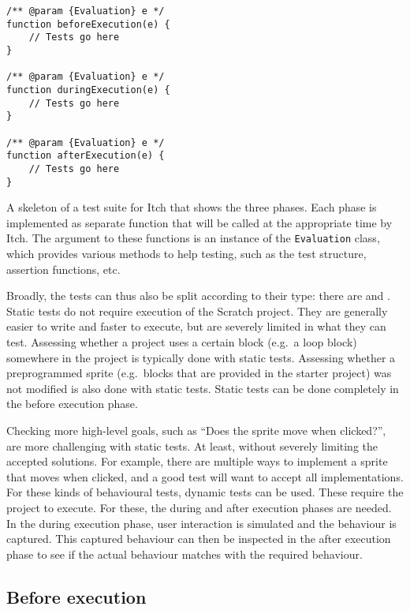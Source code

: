 \documentclass[../main]{subfiles}
\begin{document}
\begin{listing}
    \begin{verbatim}
/** @param {Evaluation} e */
function beforeExecution(e) {
    // Tests go here
}

/** @param {Evaluation} e */
function duringExecution(e) {
    // Tests go here
}

/** @param {Evaluation} e */
function afterExecution(e) {
    // Tests go here
}
    \end{verbatim}
    \caption[]{
        A skeleton of a test suite for Itch that shows the three phases.
        Each phase is implemented as separate function that will be called at the appropriate time by Itch.
        The argument to these functions is an instance of the \texttt{Evaluation} class, which provides various methods to help testing, such as the test structure, assertion functions, etc.
    }
    \label{lst:itch-test-suite-skeleton}
\end{listing}

Broadly, the tests can thus also be split according to their type: there are  and .
Static tests do not require execution of the Scratch project.
They are generally easier to write and faster to execute, but are severely limited in what they can test.
Assessing whether a project uses a certain block (e.g.\ a loop block) somewhere in the project is typically done with static tests.
Assessing whether a preprogrammed sprite (e.g.\ blocks that are provided in the starter project) was not modified is also done with static tests.
Static tests can be done completely in the before execution phase.

Checking more high-level goals, such as ``Does the sprite move when clicked?'', are more challenging with static tests.
At least, without severely limiting the accepted solutions.
For example, there are multiple ways to implement a sprite that moves when clicked, and a good test will want to accept all implementations.
For these kinds of behavioural tests, dynamic tests can be used.
These require the project to execute.
For these, the during and after execution phases are needed.
In the during execution phase, user interaction is simulated and the behaviour is captured.
This captured behaviour can then be inspected in the after execution phase to see if the actual behaviour matches with the required behaviour.


\subsection{Before execution}\label{subsec:before-execution}
\end{document}
